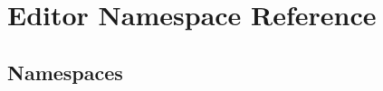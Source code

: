 \hypertarget{namespace_editor}{}\section{Editor Namespace Reference}
\label{namespace_editor}
\subsection*{Namespaces}
\begin{DoxyCompactItemize}
\end{DoxyCompactItemize}
